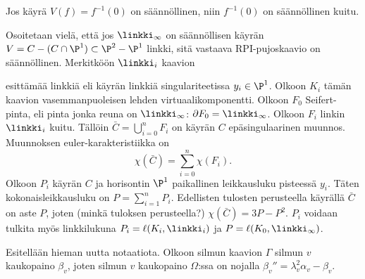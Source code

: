 
    Jos käyrä $V(f)=f^{-1}(0)$ on säännöllinen, niin $f^{-1}(0)$ on säännöllinen kuitu.

    Osoitetaan vielä, että jos $\linkki_\infty$ on säännöllisen käyrän $V=C-(C\cap\P^1)\subset\P^2-\P^1$ linkki, sitä vastaava RPI-pujoskaavio on säännöllinen. Merkitköön $\linkki_i$ kaavion 
    esittämää linkkiä eli käyrän linkkiä singulariteetissa $y_i\in\P^1$. Olkoon $K_i$ tämän kaavion vasemmanpuoleisen lehden virtuaalikomponentti. Olkoon $F_0$ Seifert-pinta, eli pinta jonka reuna on $\linkki_\infty$: $\partial F_0=\linkki_\infty$. Olkoon $F_i$ linkin $\linkki_i$ kuitu. Tällöin $\bar C=\bigcup_{i=0}^n F_i$ on käyrän $C$ epäsingulaarinen muunnos. Muunnoksen euler-karakteristiikka on
    \begin{equation*}
        \chi(\bar C)=\sum_{i=0}^{n}\chi(F_i).
    \end{equation*}
    Olkoon $P_i$ käyrän $C$ ja horisontin $\P^1$ paikallinen leikkausluku pisteessä $y_i$. Täten kokonaisleikkausluku on $P=\sum_{i=1}^{n}P_i$. Edellisten tulosten perusteella käyrällä $\bar C$ on aste $P$, joten (minkä tuloksen perusteella?) $\chi(\bar C)=3P-P^2$. $P_i$ voidaan tulkita myös linkkilukuna $P_i=\ell(K_i,\linkki_i)$ ja $P=\ell(K_0,\linkki_\infty)$.

    Esitellään hieman uutta notaatiota. Olkoon silmun kaavion $\Gamma$ silmun $v$ kaukopaino $\beta_v$, joten silmun $v$ kaukopaino $\Omega$:ssa on \citep[Prop 3.4]{Neumann1989} nojalla $\beta_v''=\lambda_v^2\alpha_v-\beta_v$.